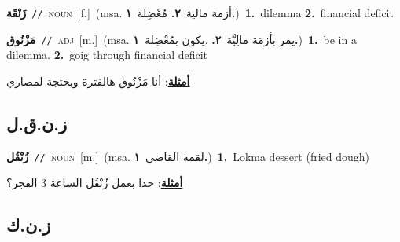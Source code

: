 \documentclass[10pt,a4paper,twoside]{article} %
\begin{document}
\begin{multicols}{2}
{\setlength\topsep{0pt}\textbf{\foreignlanguage{arabic}{زَنْقَة}}\ {\color{gray}\texttt{//}\color{black}}\ \textsc{noun}\ [f.]\ \color{gray}(msa. \foreignlanguage{arabic}{أزمة مالية}~\foreignlanguage{arabic}{\textbf{٢.}}  \foreignlanguage{arabic}{مُعْضِلة}~\foreignlanguage{arabic}{\textbf{١.}})\color{black}\ \textbf{1.}~dilemma  \textbf{2.}~financial deficit\ } \vspace{2mm}

{\setlength\topsep{0pt}\textbf{\foreignlanguage{arabic}{مَزْنُوق}}\ {\color{gray}\texttt{//}\color{black}}\ \textsc{adj}\ [m.]\ \color{gray}(msa. \foreignlanguage{arabic}{يمر بأزمَة مالِيَّة}~\foreignlanguage{arabic}{\textbf{٢.}}  .\foreignlanguage{arabic}{يكون بمُعْضِلة}~\foreignlanguage{arabic}{\textbf{١.}})\color{black}\ \textbf{1.}~be in a dilemma.  \textbf{2.}~goig through financial deficit\  \begin{flushright}\color{gray}\foreignlanguage{arabic}{\textbf{\underline{\foreignlanguage{arabic}{أمثلة}}}: أنا مَزْنُوق هالفترة وبحتجة لمصاري}\end{flushright}\color{black}} \vspace{2mm}

\vspace{-3mm}
\subsection*{\color{blue}\foreignlanguage{arabic}{ز.ن.ق.ل}\color{blue}{ (ntws)}} 

{\setlength\topsep{0pt}\textbf{\foreignlanguage{arabic}{زُنْقُل}}\ {\color{gray}\texttt{//}\color{black}}\ \textsc{noun}\ [m.]\ \color{gray}(msa. \foreignlanguage{arabic}{لقمة القاضي}~\foreignlanguage{arabic}{\textbf{١.}})\color{black}\ \textbf{1.}~Lokma dessert (fried dough)\  \begin{flushright}\color{gray}\foreignlanguage{arabic}{\textbf{\underline{\foreignlanguage{arabic}{أمثلة}}}: حدا بعمل زُنْقُل الساعة 3 الفجر؟}\end{flushright}\color{black}} \vspace{2mm}

\vspace{-3mm}
\subsection*{\color{blue}\foreignlanguage{arabic}{ز.ن.ك}\color{blue}{ (ntws)}} 


\end{multicols}
\end{document}
